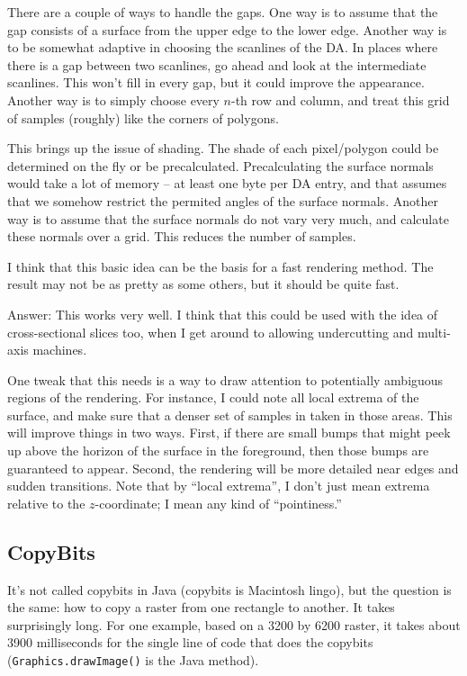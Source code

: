 \documentclass[titlepage,oneside,10pt]{article}
\begin{document}
\begin{enumerate}
There are a couple of ways to handle the gaps. One way is to assume
that the gap consists of a surface from the upper edge to the lower
edge. Another way is to be somewhat adaptive in choosing the scanlines
of the DA. In places where there is a gap between two scanlines, go
ahead and look at the intermediate scanlines. This won't fill in every
gap, but it could improve the appearance. Another way is to simply
choose every $n$-th row and column, and treat this grid of samples
(roughly) like the corners of polygons.

This brings up the issue of shading. The shade of each pixel/polygon
could be determined on the fly or be precalculated. Precalculating the
surface normals would take a lot of memory -- at least one byte per DA
entry, and that assumes that we somehow restrict the permited angles
of the surface normals. Another way is to assume that the surface
normals do not vary very much, and calculate these normals over a
grid. This reduces the number of samples.

I think that this basic idea can be the basis for a fast rendering
method. The result may not be as pretty as some others, but it should
be quite fast.

Answer: This works very well. I think that this could be used with the
idea of cross-sectional slices too, when I get around to allowing
undercutting and multi-axis machines.

One tweak that this needs is a way to draw attention to potentially
ambiguous regions of the rendering. For instance, I could note all
local extrema of the surface, and make sure that a denser set of
samples in taken in those areas. This will improve things in two
ways. First, if there are small bumps that might peek up above the
horizon of the surface in the foreground, then those bumps are
guaranteed to appear. Second, the rendering will be more detailed near
edges and sudden transitions. Note that by ``local extrema'', I don't
just mean extrema relative to the $z$-coordinate; I mean any kind of
``pointiness.''
\end{enumerate}

\subsection{CopyBits}

It's not called copybits in Java (copybits is Macintosh lingo), but
the question is the same: how to copy a raster from one rectangle to
another. It takes surprisingly long. For one example, based on a 3200
by 6200 raster, it takes about 3900 milliseconds for the single line
of code that does the copybits ({\tt Graphics.drawImage()} is the Java
method). 
\end{document}
